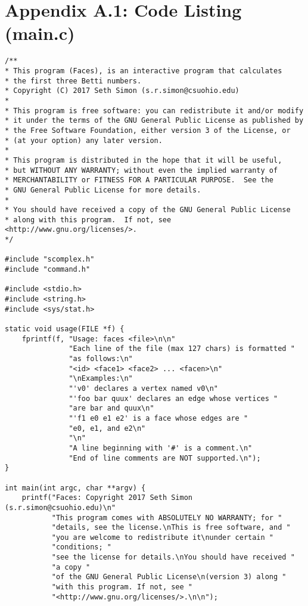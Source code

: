 \documentclass{article}
\begin{document}
\section{Appendix A.1: Code Listing (main.c)}
\small %
\begin{verbatim}
/**
* This program (Faces), is an interactive program that calculates
* the first three Betti numbers.
* Copyright (C) 2017 Seth Simon (s.r.simon@csuohio.edu)
* 
* This program is free software: you can redistribute it and/or modify
* it under the terms of the GNU General Public License as published by
* the Free Software Foundation, either version 3 of the License, or
* (at your option) any later version.
* 
* This program is distributed in the hope that it will be useful,
* but WITHOUT ANY WARRANTY; without even the implied warranty of
* MERCHANTABILITY or FITNESS FOR A PARTICULAR PURPOSE.  See the
* GNU General Public License for more details.
* 
* You should have received a copy of the GNU General Public License
* along with this program.  If not, see <http://www.gnu.org/licenses/>.
*/

#include "scomplex.h"
#include "command.h"

#include <stdio.h>
#include <string.h>
#include <sys/stat.h>

static void usage(FILE *f) {
    fprintf(f, "Usage: faces <file>\n\n"
               "Each line of the file (max 127 chars) is formatted "
               "as follows:\n"
               "<id> <face1> <face2> ... <facen>\n"
               "\nExamples:\n"
               "'v0' declares a vertex named v0\n"
               "'foo bar quux' declares an edge whose vertices "
               "are bar and quux\n"
               "'f1 e0 e1 e2' is a face whose edges are "
               "e0, e1, and e2\n"
               "\n"
               "A line beginning with '#' is a comment.\n"
               "End of line comments are NOT supported.\n");
}

int main(int argc, char **argv) {
    printf("Faces: Copyright 2017 Seth Simon (s.r.simon@csuohio.edu)\n"
           "This program comes with ABSOLUTELY NO WARRANTY; for "
           "details, see the license.\nThis is free software, and "
           "you are welcome to redistribute it\nunder certain "
           "conditions; "
           "see the license for details.\nYou should have received "
           "a copy "
           "of the GNU General Public License\n(version 3) along "
           "with this program. If not, see "
           "<http://www.gnu.org/licenses/>.\n\n");


\end{verbatim}
\end{document}

